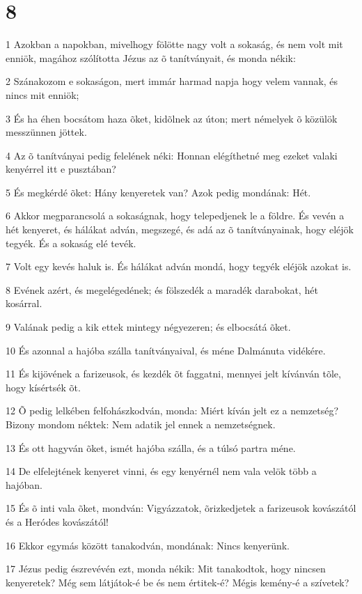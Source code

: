 \chapter{8}

\par 1 Azokban a napokban, mivelhogy fölötte nagy volt a sokaság, és nem volt mit enniök, magához szólította Jézus az õ tanítványait, és monda nékik:
\par 2 Szánakozom e sokaságon, mert immár harmad napja hogy velem vannak, és nincs mit enniök;
\par 3 És ha éhen bocsátom haza õket, kidõlnek az úton; mert némelyek õ közülök messzünnen jöttek.
\par 4 Az õ tanítványai pedig felelének néki: Honnan elégíthetné meg ezeket valaki kenyérrel itt e pusztában?
\par 5 És megkérdé õket: Hány kenyeretek van? Azok pedig mondának: Hét.
\par 6 Akkor megparancsolá a sokaságnak, hogy telepedjenek le a földre. És vevén a hét kenyeret, és hálákat adván, megszegé, és adá az õ tanítványainak, hogy eléjök tegyék. És a sokaság elé tevék.
\par 7 Volt egy kevés haluk is. És hálákat adván mondá, hogy tegyék eléjök azokat is.
\par 8 Evének azért, és megelégedének; és fölszedék a maradék darabokat, hét kosárral.
\par 9 Valának pedig a kik ettek mintegy négyezeren; és elbocsátá õket.
\par 10 És azonnal a hajóba szálla tanítványaival, és méne Dalmánuta vidékére.
\par 11 És kijövének a farizeusok, és kezdék õt faggatni, mennyei jelt kívánván tõle, hogy kísértsék õt.
\par 12 Õ pedig lelkében felfohászkodván, monda: Miért kíván jelt ez a nemzetség? Bizony mondom néktek: Nem adatik jel ennek a nemzetségnek.
\par 13 És ott hagyván õket, ismét hajóba szálla, és a túlsó partra méne.
\par 14 De elfelejtének kenyeret vinni, és egy kenyérnél nem vala velök több a hajóban.
\par 15 És õ inti vala õket, mondván: Vigyázzatok, õrizkedjetek a farizeusok kovászától és a  Heródes kovászától!
\par 16 Ekkor egymás között tanakodván, mondának: Nincs kenyerünk.
\par 17 Jézus pedig észrevévén ezt, monda nékik: Mit tanakodtok, hogy nincsen kenyeretek? Még sem látjátok-é be és nem értitek-é? Mégis kemény-é a szívetek?
